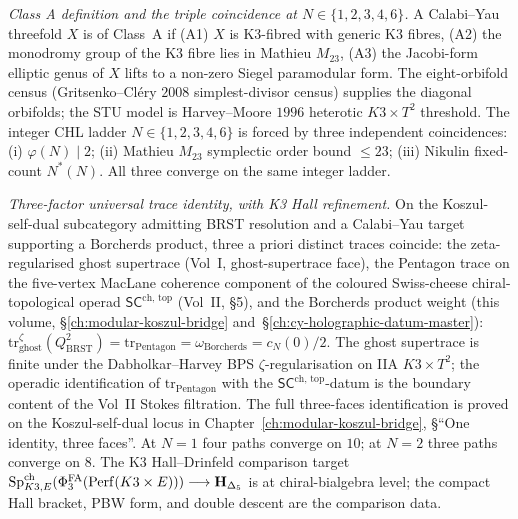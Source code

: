 \textsl{Class A definition and the triple coincidence at \(N\in\{1,2,3,4,6\}\).}\enspace
A Calabi--Yau threefold \(X\) is of Class~A if (A1) \(X\) is
K3-fibred with generic K3 fibres, (A2) the monodromy group of the
K3 fibre lies in Mathieu \(M_{23}\), (A3) the Jacobi-form elliptic
genus of \(X\) lifts to a non-zero Siegel paramodular form. The
eight-orbifold census (Gritsenko--Cl\'ery $2008$ simplest-divisor
census) supplies the diagonal orbifolds; the STU model is
Harvey--Moore $1996$ heterotic \(K3\times T^2\) threshold. The
integer CHL ladder \(N\in\{1,2,3,4,6\}\) is forced by three
independent coincidences: (i) \(\varphi(N)\mid 2\); (ii) Mathieu
\(M_{23}\) symplectic order bound \(\le 23\); (iii) Nikulin
fixed-count \(N^*(N)\). All three converge on the same integer
ladder.

\textsl{Three-factor universal trace identity, with K3 Hall refinement.}\enspace
On the Koszul-self-dual subcategory admitting BRST resolution and a
Calabi--Yau target supporting a Borcherds product, three a priori
distinct traces coincide: the zeta-regularised ghost supertrace
(Vol~I, ghost-supertrace face), the Pentagon trace on the five-vertex
MacLane coherence component of the coloured Swiss-cheese
chiral-topological operad $\mathsf{SC}^{\mathrm{ch,\,top}}$ (Vol~II,
\S5), and the Borcherds product weight (this volume,
\S\ref{ch:modular-koszul-bridge} and~\S\ref{ch:cy-holographic-datum-master}):
\(
 \mathrm{tr}^{\zeta}_{\mathrm{ghost}}(Q_{\mathrm{BRST}}^2)
 = \mathrm{tr}_{\mathrm{Pentagon}}
 = \omega_{\mathrm{Borcherds}}
 = c_N(0)/2.
\)
The ghost supertrace is finite under the Dabholkar--Harvey BPS
$\zeta$-regularisation on IIA $K3\times T^2$; the operadic identification
of $\mathrm{tr}_{\mathrm{Pentagon}}$ with the
$\mathsf{SC}^{\mathrm{ch,\,top}}$-datum is the boundary content of
the Vol~II Stokes filtration. The full three-faces identification is
proved on the Koszul-self-dual locus in
Chapter~\ref{ch:modular-koszul-bridge}, \S``One identity, three
faces''. At \(N=1\) four paths converge on \(10\); at \(N=2\)
three paths converge on \(8\). The K3 Hall--Drinfeld comparison target
\(
 \mathrm{Sp}^{\mathrm{ch}}_{K3,E}(\Phi^{\mathrm{FA}}_3(\mathrm{Perf}(K3\times E)))
 \longrightarrow \mathbf H_{\Delta_5}
\)
is at chiral-bialgebra level; the compact Hall bracket, PBW form, and
double descent are the comparison data.

